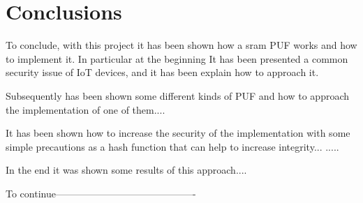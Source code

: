 \chapter{Conclusions}
To conclude, with this project it has been shown how a sram PUF works and how to implement it.
In particular at the beginning It has been presented a common security issue of IoT devices, and it has been explain how to approach it.


Subsequently has been shown some different kinds of PUF and how to approach the implementation of one of them....


It has been shown how to increase the security of the implementation with some simple precautions as a hash function that can help to increase integrity...
.....


In the end it was shown some results of this approach....

To continue-------------------------------------------
